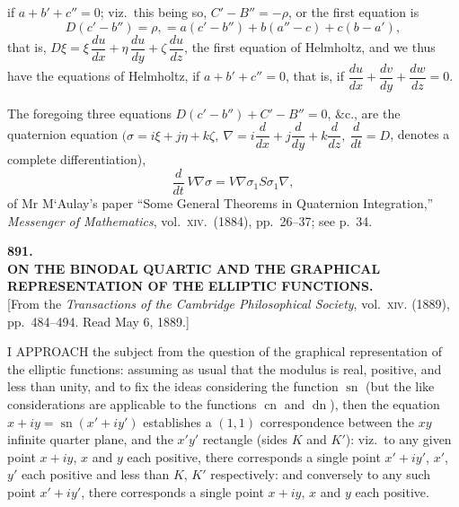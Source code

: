 \documentclass[11pt,a4paper]{article}
\providecommand{\sn}{\operatorname{sn}}
\providecommand{\cn}{\operatorname{cn}}
\providecommand{\dn}{\operatorname{dn}}
\begin{document}
\newpage

if $a + b' + c'' = 0$; viz.\ this being so, $C' - B'' = -\rho$, or the first equation is
\[
D(c' - b'') = \rho, = a(c' - b'') + b(a'' - c) + c(b - a'),
\]
that is, $D\xi = \xi\,\dfrac{du}{dx} + \eta\,\dfrac{du}{dy} + \zeta\,\dfrac{du}{dz}$, the first equation of Helmholtz, and we thus have the equations of Helmholtz, if $a + b' + c'' = 0$, that is, if $\dfrac{du}{dx} + \dfrac{dv}{dy} + \dfrac{dw}{dz} = 0$.

\smallskip
The foregoing three equations $D(c' - b'') + C' - B'' = 0$, \&c., are the quaternion equation $(\sigma = i\xi + j\eta + k\zeta,\ \nabla = i\dfrac{d}{dx} + j\dfrac{d}{dy} + k\dfrac{d}{dz},\ \dfrac{d}{dt} = D$, denotes a complete differentiation),
\[
\frac{d}{dt}\,V\nabla\sigma = V\nabla\sigma_1 S\sigma_1 \nabla,
\]
of Mr M`Aulay's paper ``Some General Theorems in Quaternion Integration,'' \emph{Messenger of Mathematics}, vol.\ \textsc{xiv}.\ (1884), pp.\ 26--37; see p.\ 34.

\bigskip

\clearpage
\begin{center}
{\large\bfseries 891.}\\[0.5em]
{\large\bfseries ON THE BINODAL QUARTIC AND THE GRAPHICAL REPRESENTATION OF THE ELLIPTIC FUNCTIONS.}\\[0.5em]
\small [From the \emph{Transactions of the Cambridge Philosophical Society}, vol.\ \textsc{xiv}. (1889), pp.\ 484--494. Read May 6, 1889.]
\end{center}
\medskip

I APPROACH the subject from the question of the graphical representation of the elliptic functions: assuming as usual that the modulus is real, positive, and less than unity, and to fix the ideas considering the function $\sn$ (but the like considerations are applicable to the functions $\cn$ and $\dn$), then the equation $x + iy = \sn(x' + iy')$ establishes a $(1, 1)$ correspondence between the $xy$ infinite quarter plane, and the $x'y'$ rectangle (sides $K$ and $K'$): viz.\ to any given point $x + iy$, $x$ and $y$ each positive, there corresponds a single point $x' + iy'$, $x'$, $y'$ each positive and less than $K$, $K'$ respectively: and conversely to any such point $x' + iy'$, there corresponds a single point $x + iy$, $x$ and $y$ each positive.
\end{document}
